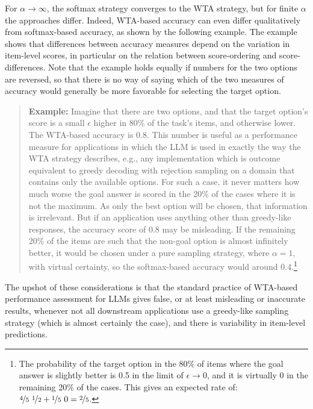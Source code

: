\documentclass[fleqn]{article}
\begin{document}
For $\alpha \rightarrow \infty$, the softmax strategy converges to the WTA strategy, but for finite $\alpha$ the approaches differ.
Indeed, WTA-based accuracy can even differ qualitatively from softmax-based accuracy, as shown by the following example.
The example shows that differences between accuracy measures depend on the variation in item-level scores, in particular on the relation between score-ordering and score-differences.
Note that the example holds equally if numbers for the two options are reversed, so that there is no way of saying which of the two measures of accuracy would generally be more favorable for selecting the target option.
%
\begin{quote}
  \textbf{Example:}
  Imagine that there are two options, and that the target option's score is a small $\epsilon$ higher in 80\% of the task's items, and otherwise lower.
  The WTA-based accuracy is 0.8.
  This number is useful as a performance measure for applications in which the LLM is used in exactly the way the WTA strategy describes, e.g., any implementation which is outcome equivalent to greedy decoding with rejection sampling on a domain that contains only the available options.
  For such a case, it never matters how much worse the goal answer is scored in the 20\% of the cases where it is not the maximum.
  As only the best option will be chosen, that information is irrelevant.
  But if an application uses anything other than greedy-like responses, the accuracy score of 0.8 may be misleading.
  If the remaining 20\% of the items are such that the non-goal option is almost infinitely better, it would be chosen under a pure sampling strategy, where $\alpha = 1$, with virtual certainty, so the softmax-based accuracy would around 0.4.\footnote{The probability of the target option in the 80\% of items where the goal answer is slightly better is 0.5 in the limit of $\epsilon \rightarrow 0$, and it is virtually 0 in the remaining 20\% of the cases. This gives an expected rate of: $\nicefrac{4}{5} \ \nicefrac{1}{2} + \nicefrac{1}{5} \ 0 = \nicefrac{2}{5}$.}
\end{quote}
%
The upshot of these considerations is that the standard practice of WTA-based performance assessment for LLMs gives false, or at least misleading or inaccurate results, whenever not all downstream applications use a greedy-like sampling strategy (which is almost certainly the case), and there is variability in item-level predictions.
\end{document}
